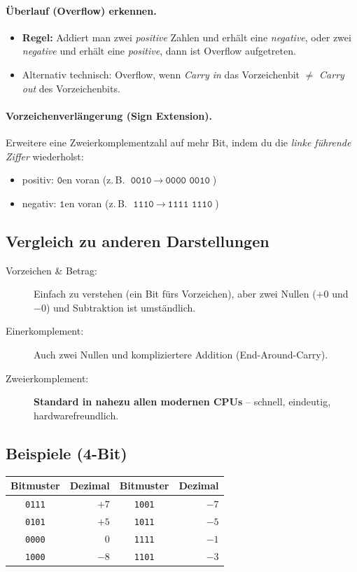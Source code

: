 \documentclass[12pt,a4paper]{book}
\begin{document}
\paragraph{Überlauf (Overflow) erkennen.}
\begin{itemize}
	\item \textbf{Regel:} Addiert man zwei \emph{positive} Zahlen und erhält eine \emph{negative}, oder zwei \emph{negative} und erhält eine \emph{positive}, dann ist Overflow aufgetreten.
	\item Alternativ technisch: Overflow, wenn \emph{Carry in} das Vorzeichenbit \(\neq\) \emph{Carry out} des Vorzeichenbits.
\end{itemize}

\paragraph{Vorzeichenverlängerung (Sign Extension).}
Erweitere eine Zweierkomplementzahl auf mehr Bit, indem du die \emph{linke führende Ziffer} wiederholst:
\begin{itemize}
	\item positiv: \(\texttt{0}\)en voran (z.\,B. \(\texttt{0010}\ \to\ \texttt{0000 0010}\))
	\item negativ: \(\texttt{1}\)en voran (z.\,B. \(\texttt{1110}\ \to\ \texttt{1111 1110}\))
\end{itemize}

\subsection*{Vergleich zu anderen Darstellungen}
\begin{description}
	\item[Vorzeichen \& Betrag:] Einfach zu verstehen (ein Bit fürs Vorzeichen), aber zwei Nullen (\(+0\) und \(-0\)) und Subtraktion ist umständlich.
	\item[Einerkomplement:] Auch zwei Nullen und kompliziertere Addition (End-Around-Carry).
	\item[Zweierkomplement:] \textbf{Standard in nahezu allen modernen CPUs} – schnell, eindeutig, hardwarefreundlich.
\end{description}

\subsection*{Beispiele (4-Bit)}
\begin{center}
	\begin{tabular}{c|r@{\qquad}c|r}
		\textbf{Bitmuster} & \textbf{Dezimal} & \textbf{Bitmuster} & \textbf{Dezimal} \\
		\hline
		\texttt{0111} & $+7$ & \texttt{1001} & $-7$ \\
		\texttt{0101} & $+5$ & \texttt{1011} & $-5$ \\
		\texttt{0000} & $0$  & \texttt{1111} & $-1$ \\
		\texttt{1000} & $-8$ & \texttt{1101} & $-3$ \\
	\end{tabular}
\end{center}
\end{document}
